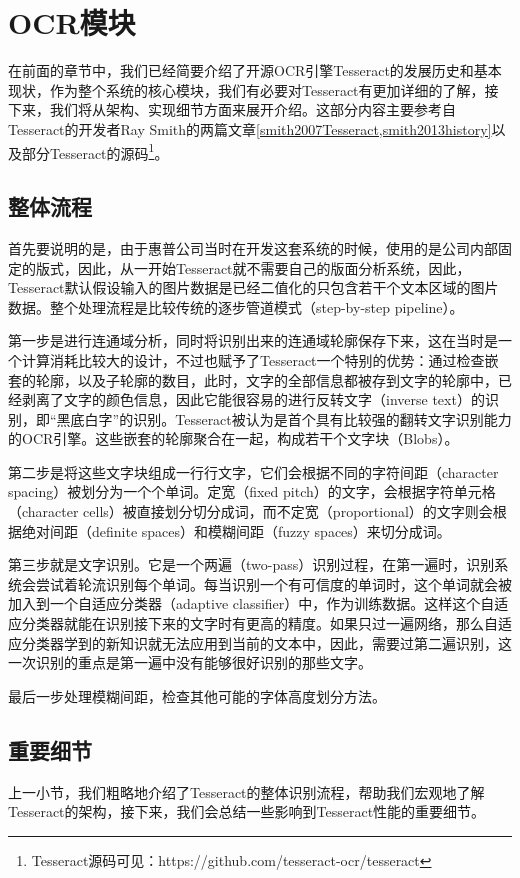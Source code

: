 \section{OCR模块}     %
在前面的章节中，我们已经简要介绍了开源OCR引擎Tesseract的发展历史和基本现状，作为整个系统的核心模块，我们有必要对Tesseract有更加详细的了解，接下来，我们将从架构、实现细节方面来展开介绍。这部分内容主要参考自Tesseract的开发者Ray Smith的两篇文章\autoref{smith2007Tesseract,smith2013history}以及部分Tesseract的源码\footnote{Tesseract源码可见：https://github.com/tesseract-ocr/tesseract}。

\subsection{整体流程}
首先要说明的是，由于惠普公司当时在开发这套系统的时候，使用的是公司内部固定的版式，因此，从一开始Tesseract就不需要自己的版面分析系统，因此，Tesseract默认假设输入的图片数据是已经二值化的只包含若干个文本区域的图片数据。整个处理流程是比较传统的逐步管道模式（step-by-step pipeline）。

第一步是进行连通域分析，同时将识别出来的连通域轮廓保存下来，这在当时是一个计算消耗比较大的设计，不过也赋予了Tesseract一个特别的优势：通过检查嵌套的轮廓，以及子轮廓的数目，此时，文字的全部信息都被存到文字的轮廓中，已经剥离了文字的颜色信息，因此它能很容易的进行反转文字（inverse text）的识别，即“黑底白字”的识别。Tesseract被认为是首个具有比较强的翻转文字识别能力的OCR引擎。这些嵌套的轮廓聚合在一起，构成若干个文字块（Blobs）。

第二步是将这些文字块组成一行行文字，它们会根据不同的字符间距（character spacing）被划分为一个个单词。定宽（fixed pitch）的文字，会根据字符单元格（character cells）被直接划分切分成词，而不定宽（proportional）的文字则会根据绝对间距（definite spaces）和模糊间距（fuzzy spaces）来切分成词。

第三步就是文字识别。它是一个两遍（two-pass）识别过程，在第一遍时，识别系统会尝试着轮流识别每个单词。每当识别一个有可信度的单词时，这个单词就会被加入到一个自适应分类器（adaptive classifier）中，作为训练数据。这样这个自适应分类器就能在识别接下来的文字时有更高的精度。如果只过一遍网络，那么自适应分类器学到的新知识就无法应用到当前的文本中，因此，需要过第二遍识别，这一次识别的重点是第一遍中没有能够很好识别的那些文字。

最后一步处理模糊间距，检查其他可能的字体高度划分方法。

\subsection{重要细节}
上一小节，我们粗略地介绍了Tesseract的整体识别流程，帮助我们宏观地了解Tesseract的架构，接下来，我们会总结一些影响到Tesseract性能的重要细节。

